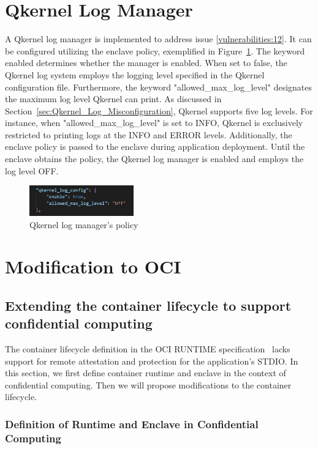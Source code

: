 \section{Qkernel Log Manager}
\label{sec:Qkernel_logger}
A Qkernel log manager is implemented to address issue \ref{vulnerabilities:12}. It can be configured utilizing the enclave policy, exemplified in Figure~\ref{fig:qkernel_Log_config}. The keyword enabled determines whether the manager is enabled. When set to false, the Qkernel log system employs the logging level specified in 
the Qkernel configuration file. Furthermore, the keyword "allowed\_max\_log\_level" designates the maximum log level Qkernel can print. As discussed in Section~\ref{sec:Qkernel_Log_Misconfiguration}, Qkernel supports five log levels. For instance, when "allowed\_max\_log\_level" is set to INFO, Qkernel is exclusively restricted to printing 
logs at the INFO and ERROR levels. Additionally, the enclave policy is passed to the enclave during application deployment. Until the enclave obtains the policy, the Qkernel log manager is enabled and employs the log level OFF.
\begin{figure}[!htb]
    \centering
    \includegraphics[width=0.4\textwidth]{images/qkernel_Log_config.png}
    \caption[Qkernel log manager's policy]{Qkernel log manager's policy}
    \label{fig:qkernel_Log_config}
\end{figure}

\section{Modification to OCI}
\label{sec:Modification_OCI}

\subsection{Extending the container lifecycle to support confidential computing}
The container lifecycle definition in the OCI RUNTIME specification~\cite*{oci-runtime-spec} lacks support for remote attestation and protection for the application’s STDIO. In this section, we first define container runtime and enclave in the context of confidential computing. Then we will propose modifications to the container 
lifecycle.


\subsubsection{Definition of Runtime and Enclave in Confidential Computing}

